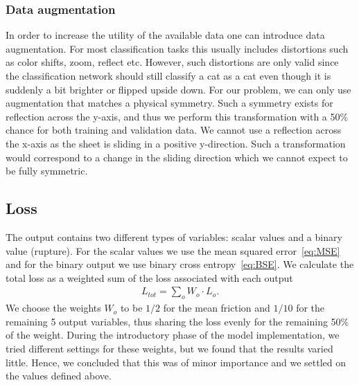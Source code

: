 \subsubsection{Data augmentation}
In order to increase the utility of the available data one can introduce data
augmentation. For most classification tasks this usually includes distortions
such as color shifts, zoom, reflect etc. However, such distortions are only valid
since the classification network should still classify a cat as a cat even
though it is suddenly a bit brighter or flipped upside down. For our problem, we
can only use augmentation that matches a physical symmetry. Such a symmetry
exists for reflection across the y-axis, and thus we perform this transformation
with a 50\% chance for both training and validation data. We cannot use a reflection
across the x-axis as the sheet is sliding in a positive y-direction. Such a
transformation would correspond to a change in the sliding direction which we
cannot expect to be fully symmetric. 


\subsection{Loss}\label{sec:loss}
The output contains two different types of variables: scalar values and a binary value (rupture). For the scalar values we use the mean squared error~\cref{eq:MSE} and for the binary output we use binary cross entropy~\cref{eq:BSE}. We calculate the total loss as a weighted sum of the loss associated with
each output
\begin{align*}
  L_{tot} = \sum_{o} W_o\cdot L_o.
\end{align*}
We choose the weights $W_o$ to be $1/2$ for the mean friction and $1/10$ for the
remaining 5 output variables, thus sharing the loss evenly for the remaining 50\% of the weight. During the introductory phase of the model implementation, we tried different settings for these weights, but we found that the results varied little. Hence, we concluded that this was of minor importance and we settled on the values defined above.

